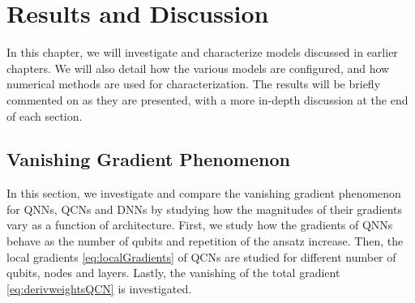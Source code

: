 \chapter{Results and Discussion}\label{chap:results_discussion}
In this chapter, we will investigate and characterize models discussed in earlier chapters. We will also detail how the various models are configured, and how numerical methods are used for characterization. The results will be briefly commented on as they are presented, with a more in-depth discussion at the end of each section.






\section{Vanishing Gradient Phenomenon}\label{sec:Vanishing Gradient Phenomenon}
In this section, we investigate and compare the vanishing gradient phenomenon for QNNs, QCNs and DNNs by studying how the magnitudes of their gradients vary as a function of architecture. First, we study how the gradients of QNNs behave as the number of qubits and repetition of the ansatz increase. Then, the local gradients \autoref{eq:localGradients} of QCNs are studied for different number of qubits, nodes and layers. Lastly, the vanishing of the total gradient \autoref{eq:derivweightsQCN} is investigated.


